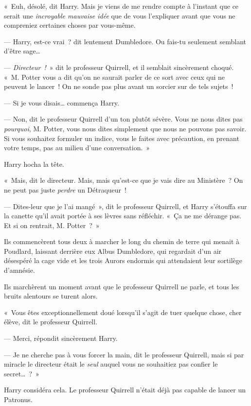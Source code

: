 «~Euh, désolé, dit Harry.
Mais je viens de me rendre compte à l'instant que ce serait une \emph{incroyable mauvaise idée} que de vous l'expliquer avant que vous ne compreniez certaines choses par vous-même.

--- Harry, est-ce vrai~? dit lentement Dumbledore.
Ou fais-tu seulement semblant d'être sage…

--- \emph{Directeur~!}~» dit le professeur Quirrell, et il semblait sincèrement choqué.
«~M. Potter vous a dit qu'on ne saurait parler de ce sort avec ceux qui ne peuvent le lancer~!
On ne sonde pas plus avant un sorcier sur de tels sujets~!

--- Si je vous disais… commença Harry.

--- Non, dit le professeur Quirrell d'un ton plutôt sévère.
Vous ne nous dites pas \emph{pourquoi}, M. Potter, vous nous dites simplement que nous ne pouvons pas savoir.
Si vous souhaitez formuler un indice, vous le faites avec précaution, en prenant votre temps, pas au milieu d'une conversation.~»

Harry hocha la tête.

«~Mais, dit le directeur.
Mais, mais qu'est-ce que je vais dire au Ministère~?
On ne peut pas juste \emph{perdre} un Détraqueur~!

--- Dites-leur que je l'ai mangé~», dit le professeur Quirrell, et Harry s'étouffa sur la canette qu'il avait portée à ses lèvres sans réfléchir.
«~Ça ne me dérange pas.
Et si on rentrait, M. Potter~?~»

Ils commencèrent tous deux à marcher le long du chemin de terre qui menait à Poudlard, laissant derrière eux Albus Dumbledore, qui regardait d'un air désespéré la cage vide et les trois Aurors endormis qui attendaient leur sortilège d'amnésie.


Ils marchèrent un moment avant que le professeur Quirrell ne parle, et tous les bruits alentours se turent alors.

«~Vous êtes exceptionnellement doué lorsqu'il s'agit de tuer quelque chose, cher élève, dit le professeur Quirrell.

--- Merci, répondit sincèrement Harry.

--- Je ne cherche pas à vous forcer la main, dit le professeur Quirrell, mais si par miracle le directeur était le \emph{seul} auquel vous ne souhaitiez pas confier le secret…~?~»

Harry considéra cela.
Le professeur Quirrell n'était déjà pas capable de lancer un Patronus.

